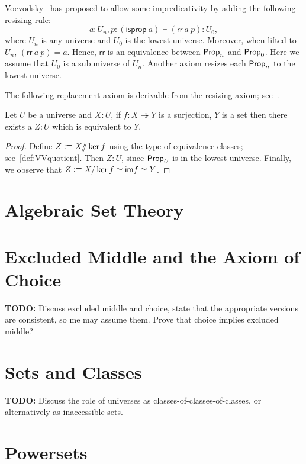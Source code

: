 Voevodsky~\cite{Universe-poly} has proposed to allow some impredicativity by adding the following resizing rule:
\[a:U_n, p:(\mathsf{isprop}\ a)\vdash (\mathsf{rr}\ a\ p): U_0,\]
where $U_n$ is any universe and $U_0$ is the lowest universe.
Moreover, when lifted to $U_n$, $(\mathsf{rr}\ a\ p)= a$.
Hence, $\mathsf{rr}$ is an equivalence between $\mathsf{Prop}_n$ and $\mathsf{Prop}_0$. 
Here we assume that $U_0$ is a subuniverse of $U_n$. 
Another axiom resizes each $\mathsf{Prop}_n$ to the lowest universe.

The following replacement axiom is derivable from the resizing axiom; see~\cite{Universe-poly}.
\begin{lem}
Let $U$ be a universe and $X:U$, if $f:X\twoheadrightarrow Y$ is a surjection, $Y$ is a set then there exists a $Z:U$ which is
equivalent to $Y$.
\end{lem}
\begin{proof}
Define $Z\vcentcolon\equiv X/\!\!/\ker f$ using the type of equivalence classes; see~\ref{def:VVquotient}. 
Then $Z:U$, since $\mathsf{Prop}_U$ is in the lowest universe. Finally, we observe that $Z\vcentcolon\equiv X/\ker f\simeq\mathsf{im} f\simeq Y$.
\end{proof}

\section{Algebraic Set Theory}


\section{Excluded Middle and the Axiom of Choice}
\label{sec:excl-middle-axiom}

\textbf{TODO:} Discuss excluded middle and choice, state that the appropriate versions are
consistent, so me may assume them. Prove that choice implies excluded middle?

\section{Sets and Classes}
\label{sec:sets-classes}

\textbf{TODO:} Discuss the role of universes as classes-of-classes-of-classes, or
alternatively as inaccessible sets.

\section{Powersets}
\label{sec:powersets}

